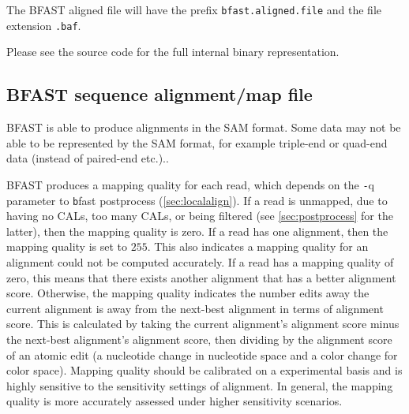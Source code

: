 \documentclass[a4paper,12pt]{book}
\newcommand{\TT}[1]{{\tt #1}} %
\newcommand{\QU}[1]{``#1''} %
\newcommand{\BAF}{BFAST aligned file} %
\newcommand{\BSAMF}{BFAST sequence alignment/map file} %
\begin{document}
The \BAF{} will have the prefix \TT{bfast.aligned.file} and the file extension \TT{.baf}.

Please see the source code for the full internal binary representation.

%

\subsection{\BSAMF{}}
BFAST is able to produce alignments in the SAM format.
Some data may not be able to be represented by the SAM format, for example triple-end or quad-end data (instead of paired-end etc.)..

BFAST produces a mapping quality for each read, which depends on the {\TT -q} parameter to {\TT bfast postprocess} (\autoref{sec:localalign}).
If a read is unmapped, due to having no CALs, too many CALs, or being filtered (see \autoref{sec:postprocess} for the latter), then the mapping quality is zero.
If a read has one alignment, then the mapping quality is set to $255$.
This also indicates a mapping quality for an alignment could not be computed accurately.
If a read has a mapping quality of zero, this means that there exists another alignment that has a better alignment score.
Otherwise, the mapping quality indicates the number edits away the current alignment is away from the next-best alignment in terms of alignment score.
This is calculated by taking the current alignment's alignment score minus the next-best alignment's alignment score, then dividing by the alignment score of an atomic edit (a nucleotide change in nucleotide space and a color change for color space). 
Mapping quality should be calibrated on a experimental basis and is highly sensitive to the sensitivity settings of alignment.
In general, the mapping quality is more accurately assessed under higher sensitivity scenarios.
\end{document}
